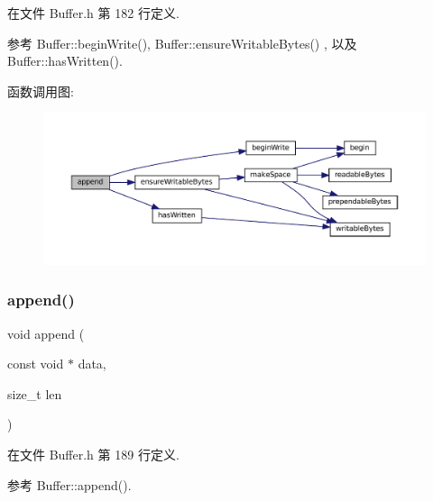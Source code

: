 在文件 Buffer.\+h 第 182 行定义.



参考 Buffer\+::begin\+Write(), Buffer\+::ensure\+Writable\+Bytes() , 以及 Buffer\+::has\+Written().

函数调用图\+:
\nopagebreak
\begin{figure}[H]
\begin{center}
\leavevmode
\includegraphics[width=350pt]{classmuduo_1_1net_1_1Buffer_adece1d853752b95184d19c78228a0c39_cgraph}
\end{center}
\end{figure}
\mbox{\label{classmuduo_1_1net_1_1Buffer_af4c97664922a815eb9aa9dfe78686007}} 
\subsubsection{\texorpdfstring{append()}{append()}\hspace{0.1cm}{\footnotesize\ttfamily [3/3]}}
{\footnotesize\ttfamily void append (\begin{DoxyParamCaption}\item[{const void $\ast$}]{data,  }\item[{size\+\_\+t}]{len }\end{DoxyParamCaption})\hspace{0.3cm}{\ttfamily [inline]}}



在文件 Buffer.\+h 第 189 行定义.



参考 Buffer\+::append().

